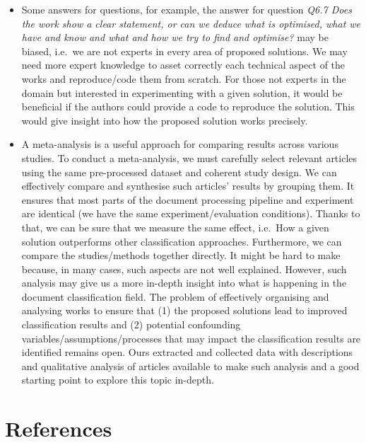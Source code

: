 \documentclass[
]{article}
\begin{document}
\begin{itemize}
\item
  Some answers for questions, for example, the answer for question \emph{Q6.7 Does the work show a clear statement, or can we deduce what is optimised, what we have and know and what and how we try to find and optimise?} may be biased, i.e.~we are not experts in every area of proposed solutions. We may need more expert knowledge to asset correctly each technical aspect of the works and reproduce/code them from scratch. For those not experts in the domain but interested in experimenting with a given solution, it would be beneficial if the authors could provide a code to reproduce the solution. This would give insight into how the proposed solution works precisely.
\item
  A meta-analysis is a useful approach for comparing results across various studies. To conduct a meta-analysis, we must carefully select relevant articles using the same pre-processed dataset and coherent study design. We can effectively compare and synthesise such articles' results by grouping them. It ensures that most parts of the document processing pipeline and experiment are identical (we have the same experiment/evaluation conditions). Thanks to that, we can be sure that we measure the same effect, i.e.~How a given solution outperforms other classification approaches. Furthermore, we can compare the studies/methods together directly. It might be hard to make because, in many cases, such aspects are not well explained. However, such analysis may give us a more in-depth insight into what is happening in the document classification field. The problem of effectively organising and analysing works to ensure that (1) the proposed solutions lead to improved classification results and (2) potential confounding variables/assumptions/processes that may impact the classification results are identified remains open. Ours extracted and collected data with descriptions and qualitative analysis of articles available to make such analysis and a good starting point to explore this topic in-depth.
\end{itemize}

\hypertarget{references}{%
\section{References}\label{references}}
\end{document}
